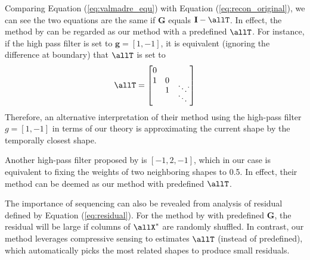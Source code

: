 Comparing Equation (\ref{eq:valmadre_equ}) with Equation (\ref{eq:recon_original}), we can see the two equations are the same if $\mathbf{G}$ equals $\mathbf{I}-\allT$.
In effect, the method by \cite{Valmadre_CVPR2012} can be regarded as our method with a predefined $\allT$.
For instance,  if the high pass filter is set to $\mathbf{g}=[1,-1]$, it is equivalent (ignoring the difference at boundary) that $\allT$ is set to
\begin{equation}
\allT = \left[
\begin{matrix}
0 &   & \\
1 & 0 & \\[-7pt]
  &	1 & \ddots \\[-7pt]
  &   & \ddots 
\end{matrix}.
\right]
\end{equation}
Therefore, an alternative interpretation of their method \cite{Valmadre_CVPR2012} using the high-pass filter $g=[1,-1]$ in terms of our theory is approximating the current shape by the temporally closest shape. 

Another high-pass filter proposed by \citet{Valmadre_CVPR2012} is $[-1, 2, -1]$, which in our case is equivalent to fixing the weights of two neighboring shapes to 0.5. %
In effect, their method can be deemed as our method with predefined $\allT$. 

The importance of sequencing can also be revealed from analysis of residual defined by Equation (\ref{eq:residual}). For the method by \cite{Valmadre_CVPR2012} with predefined $\mathbf{G}$, the residual will be large if columns of $\allX^*$ are randomly shuffled. In contrast, our method leverages compressive sensing to estimates $\allT$ (instead of predefined), which automatically picks the most related shapes to produce small residuals.




